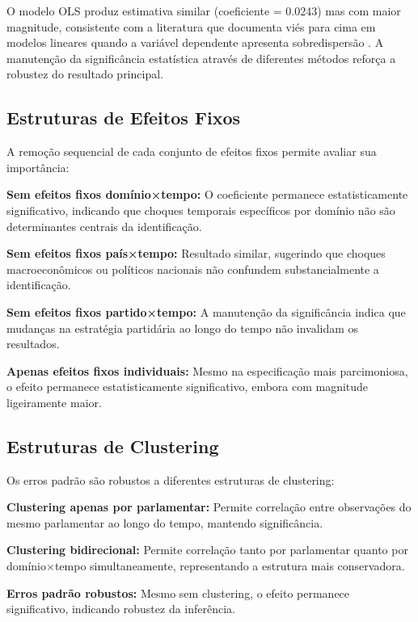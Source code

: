 O modelo OLS produz estimativa similar (coeficiente = 0.0243) mas com maior magnitude, consistente com a literatura que documenta viés para cima em modelos lineares quando a variável dependente apresenta sobredispersão \cite{silva2006log}. A manutenção da significância estatística através de diferentes métodos reforça a robustez do resultado principal.



\subsection{Estruturas de Efeitos Fixos}

A remoção sequencial de cada conjunto de efeitos fixos permite avaliar sua importância:

\textbf{Sem efeitos fixos domínio×tempo:} O coeficiente permanece estatisticamente significativo, indicando que choques temporais específicos por domínio não são determinantes centrais da identificação.

\textbf{Sem efeitos fixos país×tempo:} Resultado similar, sugerindo que choques macroeconômicos ou políticos nacionais não confundem substancialmente a identificação.

\textbf{Sem efeitos fixos partido×tempo:} A manutenção da significância indica que mudanças na estratégia partidária ao longo do tempo não invalidam os resultados.

\textbf{Apenas efeitos fixos individuais:} Mesmo na especificação mais parcimoniosa, o efeito permanece estatisticamente significativo, embora com magnitude ligeiramente maior.

\subsection{Estruturas de Clustering}

Os erros padrão são robustos a diferentes estruturas de clustering:

\textbf{Clustering apenas por parlamentar:} Permite correlação entre observações do mesmo parlamentar ao longo do tempo, mantendo significância.

\textbf{Clustering bidirecional:} Permite correlação tanto por parlamentar quanto por domínio×tempo simultaneamente, representando a estrutura mais conservadora.

\textbf{Erros padrão robustos:} Mesmo sem clustering, o efeito permanece significativo, indicando robustez da inferência.

